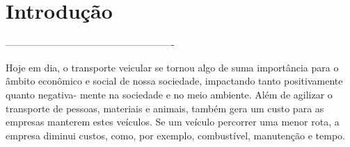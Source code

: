 \documentclass[final,5p,times,twocolumn]{elsarticle}
\begin{document}



\section{Introdução}
	



	


	----------------------------------------------------  


	Hoje em dia, o transporte veicular se tornou algo de suma importância para o âmbito
	econômico e social de nossa sociedade, impactando tanto positivamente quanto negativa-
	mente na sociedade e no meio ambiente. 
	Além de agilizar o transporte de pessoas, materiais e animais, também gera um
	custo para as empresas manterem estes veículos. Se um veículo percorrer uma menor rota,
	a empresa diminui custos, como, por exemplo, combustível, manutenção e tempo. 
\end{document}
